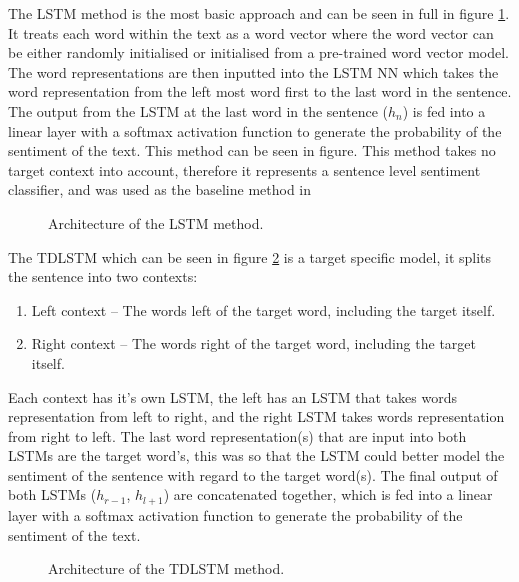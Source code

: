 The LSTM method is the most basic approach and can be seen in full in figure \ref{fig:repro_lstm_method}. It treats each word within the text as a word vector where the word vector can be either randomly initialised or initialised from a pre-trained word vector model. The word representations are then inputted into the LSTM NN which takes the word representation from the left most word first to the last word in the sentence. The output from the LSTM at the last word in the sentence ($h_n$) is fed into a linear layer with a softmax activation function to generate the probability of the sentiment of the text. This method can be seen in figure. This method takes no target context into account, therefore it represents a sentence level sentiment classifier, and was used as the baseline method in \citet{repro_tang_2016}\\
\begin{figure}[!ht]
    \centering
    
    \caption{Architecture of the LSTM method.}
    \label{fig:repro_lstm_method}
\end{figure}

The TDLSTM which can be seen in figure \ref{fig:repro_tdlstm_method} is a target specific model, it splits the sentence into two contexts:
\begin{enumerate}
    \item Left context -- The words left of the target word, including the target itself.
    \item Right context -- The words right of the target word, including the target itself.
\end{enumerate}
Each context has it's own LSTM, the left has an LSTM that takes words representation from left to right, and the right LSTM takes words representation from right to left. The last word representation(s) that are input into both LSTMs are the target word's, this was so that the LSTM could better model the sentiment of the sentence with regard to the target word(s). The final output of both LSTMs ($h_{r-1}$, $h_{l+1}$) are concatenated together, which is fed into a linear layer with a softmax activation function to generate the probability of the sentiment of the text.

\begin{figure}[!ht]
    \centering
    
    \caption{Architecture of the TDLSTM method.}
    \label{fig:repro_tdlstm_method}
\end{figure}


